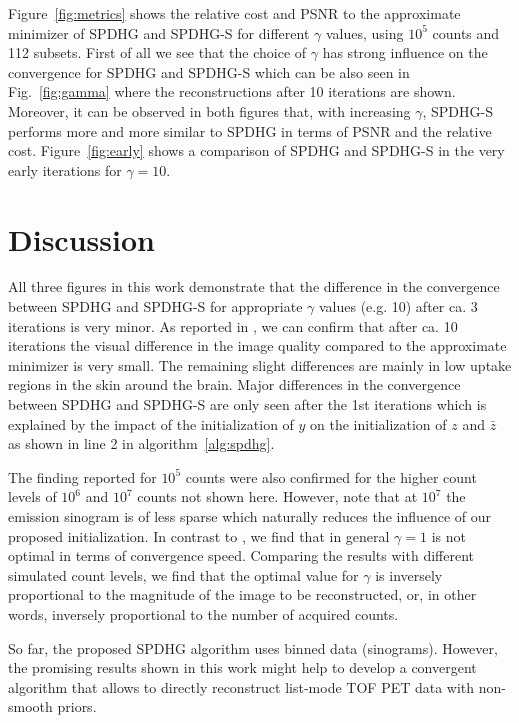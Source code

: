 \documentclass[11pt,twocolumn,twoside]{article}
\begin{document}
Figure~\ref{fig:metrics} shows the relative cost and PSNR to the approximate minimizer of 
SPDHG and SPDHG-S for different $\gamma$ values, using $10^5$ counts and 112 subsets.
First of all we see that the choice of $\gamma$ has strong influence on the convergence for
SPDHG and SPDHG-S which can be also seen in Fig.~\ref{fig:gamma} where the reconstructions
after 10 iterations are shown. 
Moreover, it can be observed in both figures that, 
with increasing $\gamma$, SPDHG-S performs more and more similar to SPDHG in terms 
of PSNR and the relative cost.
Figure~\ref{fig:early} shows a comparison of SPDHG and SPDHG-S in the very early iterations
for $\gamma = 10$.

\section{Discussion}

All three figures in this work demonstrate that the difference in the convergence between 
SPDHG and SPDHG-S for appropriate $\gamma$ values (e.g. 10) after ca. 3 iterations is very minor.
As reported in \cite{Ehrhardt2019}, we can confirm that after ca. 10 iterations the visual difference
in the image quality compared to the approximate minimizer is very small.
The remaining slight differences are mainly in low uptake regions in the skin around the brain.
Major differences in the convergence between SPDHG and SPDHG-S are only seen after the
1st iterations which is explained by the impact of the initialization of $y$ on the initialization
of $z$ and $\bar{z}$ as shown in line 2 in algorithm~\ref{alg:spdhg}.

The finding reported for $10^5$ counts were also confirmed for the higher count levels 
of $10^6$ and $10^7$ counts not shown here. 
However, note that at $10^7$ the emission sinogram is of less sparse
which naturally reduces the influence of our proposed initialization.
In contrast to \cite{Ehrhardt2019}, we find that in general $\gamma = 1$ is not optimal
in terms of convergence speed. 
Comparing the results with different simulated count levels, we find that the optimal value
for $\gamma$ is inversely proportional to the magnitude of the image to be reconstructed, or, 
in other words, inversely proportional to the number of acquired counts.

So far, the proposed SPDHG algorithm uses binned data (sinograms).
However, the promising results shown in this work might help to develop a convergent
algorithm that allows to directly reconstruct list-mode TOF PET data with non-smooth
priors.
\end{document}
